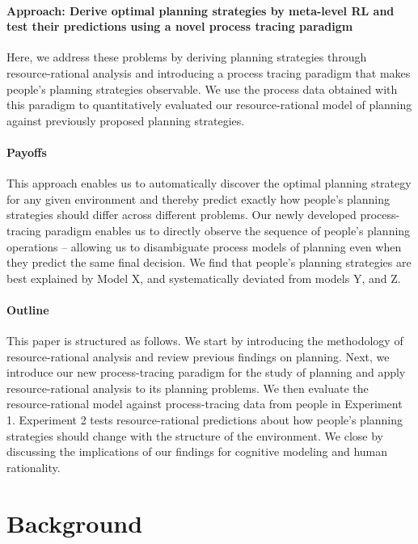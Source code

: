 \paragraph{Approach: Derive optimal planning strategies by meta-level RL and test their predictions using a novel process tracing paradigm}
Here, we address these problems by deriving planning strategies through resource-rational analysis and introducing a process tracing paradigm that makes people's planning strategies observable. We use the process data obtained with this paradigm to quantitatively evaluated our resource-rational model of planning against previously proposed planning strategies.

\paragraph{Payoffs}
This approach enables us to automatically discover the optimal planning strategy for any given environment and thereby predict exactly how people's planning strategies should differ across different problems. Our newly developed process-tracing paradigm enables us to directly observe the sequence of people's planning operations -- allowing us to disambiguate process models of planning even when they predict the same final decision. We find that people's planning strategies are best explained by Model X, and systematically deviated from models Y, and Z. 

\paragraph{Outline}
This paper is structured as follows. We start by introducing the methodology of resource-rational analysis and review previous findings on planning. Next, we introduce our new process-tracing paradigm for the study of planning and apply resource-rational analysis to its planning problems. We then evaluate the resource-rational model against process-tracing data from people in Experiment 1. Experiment 2 tests resource-rational predictions about how people's planning strategies should change with the structure of the environment. We close by discussing the implications of our findings for cognitive modeling and human rationality.

\section{Background}
\label{sec:background}

